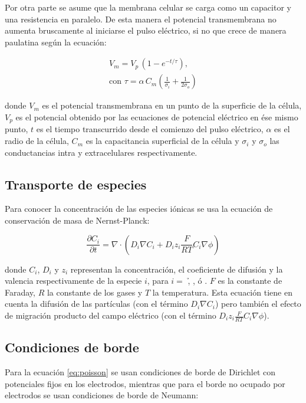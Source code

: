 Por otra parte se asume que la membrana celular se carga como un capacitor y una resistencia en paralelo. De esta manera el potencial transmembrana no aumenta bruscamente al iniciarse el pulso eléctrico, si no que crece de manera paulatina según la ecuación: 

\begin{equation} \label{eq:capacit} \begin{split}
	V_m = V_p\, (1 - e^{-t/\tau}) , \\ \textrm{con } \tau = \alpha\, C_m \left( \frac{1}{\sigma_i} + \frac{1}{2 \sigma_o} \right)
\end{split} \end{equation}

donde $V_m$ es el potencial transmembrana en un punto de la superficie de la célula, $V_p$ es el potencial obtenido por las ecuaciones de potencial eléctrico en ése mismo punto, $t$ es el tiempo transcurrido desde el comienzo del pulso eléctrico, $\alpha$ es el radio de la célula, $C_m$ es la capacitancia superficial de la célula y $\sigma_i$ y $\sigma_o$ las conductancias intra y extracelulares respectivamente.\\

\subsection*{Transporte de especies}
Para conocer la concentración de las especies iónicas se usa la ecuación de conservación de masa de Nernst-Planck:

\begin{equation} \label{eq:trans}
	\frac{\partial C_i}{\partial t} = \nabla \cdot \left( D_i \nabla C_i + D_i z_i \frac{F}{R T} C_i \nabla \phi \right)
\end{equation}

donde $C_i$, $D_i$ y $z_i$ representan la concentración, el coeficiente de difusión y la valencia respectivamente de la especie $i$, para $i = $ \h, \oh, \na ó \cl.
$F$ es la constante de Faraday, $R$ la constante de los gases y $T$ la temperatura. 
Esta ecuación tiene en cuenta la difusión de las partículas (con el término $D_i \nabla C_i$) pero también el efecto de migración producto del campo eléctrico (con el término $D_i z_i \frac{F}{R T} C_i \nabla \phi$).\\

\subsection*{Condiciones de borde}
Para la ecuación \ref{eq:poisson} se usan condiciones de borde de Dirichlet con potenciales fijos en los electrodos, mientras que para el borde no ocupado por electrodos se usan condiciones de borde de Neumann:

